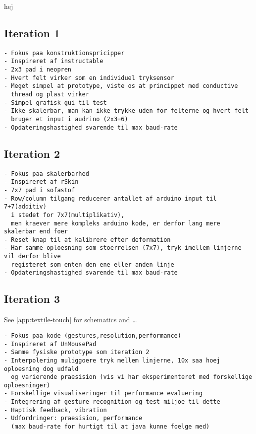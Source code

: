 hej
\subsection{Iteration 1}
\begin{verbatim}
- Fokus paa konstruktionspricipper
- Inspireret af instructable
- 2x3 pad i neopren
- Hvert felt virker som en individuel tryksensor
- Meget simpel at prototype, viste os at princippet med conductive 
  thread og plast virker
- Simpel grafisk gui til test
- Ikke skalerbar, man kan ikke trykke uden for felterne og hvert felt
  bruger et input i audrino (2x3=6)
- Opdateringshastighed svarende til max baud-rate
\end{verbatim}
\subsection{Iteration 2}
\begin{verbatim}
- Fokus paa skalerbarhed
- Inspireret af rSkin
- 7x7 pad i sofastof
- Row/column tilgang reducerer antallet af arduino input til 7+7(additiv)
  i stedet for 7x7(multiplikativ),
  men kraever mere kompleks arduino kode, er derfor lang mere skalerbar end foer
- Reset knap til at kalibrere efter deformation
- Har samme oploesning som stoerrelsen (7x7), tryk imellem linjerne vil derfor blive 
  registeret som enten den ene eller anden linje
- Opdateringshastighed svarende til max baud-rate
\end{verbatim}
\subsection{Iteration 3}
See \ref{app:textile-touch} for schematics and \dots
\begin{verbatim}
- Fokus paa kode (gestures,resolution,performance)
- Inspireret af UnMousePad
- Samme fysiske prototype som iteration 2
- Interpolering muliggoere tryk mellem linjerne, 10x saa hoej oploesning dog udfald 
  og varierende praesision (vis vi har eksperimenteret med forskellige oploesninger)
- Forskellige visualiseringer til performance evaluering
- Integrering af gesture recognition og test miljoe til dette
- Haptisk feedback, vibration
- Udfordringer: praesision, performance 
  (max baud-rate for hurtigt til at java kunne foelge med)
\end{verbatim}